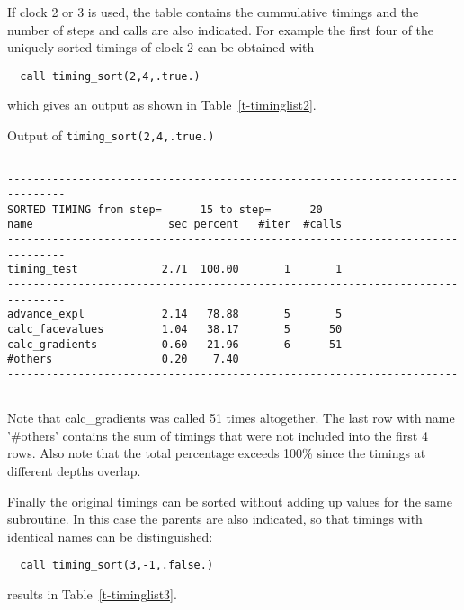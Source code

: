 If clock 2 or 3 is used, the table contains the cummulative timings 
and the number of steps and calls are also indicated. 
For example the first four of the uniquely sorted timings of clock 2 
can be obtained with
\begin{verbatim}
  call timing_sort(2,4,.true.)
\end{verbatim}
which gives an output as shown in Table~\ref{t-timinglist2}.
\begin{table}
\caption{Output of {\tt timing\_sort(2,4,.true.)}}

{\footnotesize
\begin{verbatim}

-------------------------------------------------------------------------------
SORTED TIMING from step=      15 to step=      20
name                     sec percent   #iter  #calls
-------------------------------------------------------------------------------
timing_test             2.71  100.00       1       1
-------------------------------------------------------------------------------
advance_expl            2.14   78.88       5       5
calc_facevalues         1.04   38.17       5      50
calc_gradients          0.60   21.96       6      51
#others                 0.20    7.40
-------------------------------------------------------------------------------

\end{verbatim}
}
\label{t-timinglist2}
\end{table}
Note that calc\_gradients was called 51 times altogether. The last row
with name '\#others' contains the sum of timings that were not included
into the first 4 rows. Also note that the total percentage exceeds 
100\% since the timings at different depths overlap.

Finally the original timings can be sorted without adding up values
for the same subroutine. In this case the parents are also indicated,
so that timings with identical names can be distinguished:
\begin{verbatim}
  call timing_sort(3,-1,.false.)
\end{verbatim}
results in Table~\ref{t-timinglist3}.

